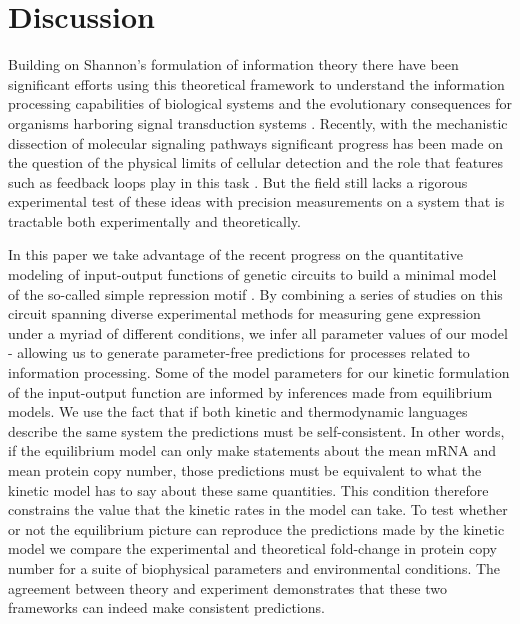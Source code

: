\section*{Discussion}

Building on Shannon's formulation of information theory there have been
significant efforts using this theoretical framework to understand the
information processing capabilities of biological systems and the evolutionary
consequences for organisms harboring signal transduction systems
\cite{Bergstrom2004, Taylor2007a, Tkacik2008, Polani2009, Nemenman2010,
Rivoire2011}. Recently, with the mechanistic dissection of molecular signaling
pathways significant progress has been made on the question of the physical
limits of cellular detection and the role that features such as feedback loops
play in this task \cite{Bialek2005, Libby2007, Tkacik2011, Rhee2012a,
Voliotis2014a}. But the field still lacks a rigorous experimental test of these
ideas with precision measurements on a system that is tractable both
experimentally and theoretically.

In this paper we take advantage of the recent progress on the quantitative
modeling of input-output functions of genetic circuits to build a minimal model
of the so-called simple repression motif . By combining a
series of studies on this circuit spanning diverse experimental methods for
measuring gene expression under a myriad of different conditions, we infer all
parameter values of our model - allowing us to generate parameter-free
predictions for processes related to information processing. Some of the model
parameters for our kinetic formulation of the input-output function are informed
by inferences made from equilibrium models. We use the fact that if both
kinetic and thermodynamic languages describe the same system the predictions
must be self-consistent. In other words, if the equilibrium model can only make
statements about the mean mRNA and mean protein copy number, those predictions
must be equivalent to what the kinetic model has to say about these same
quantities. This condition therefore constrains the value that the kinetic rates
in the model can take. To test whether or not the equilibrium picture can
reproduce the predictions made by the kinetic model we compare the experimental
and theoretical fold-change in protein copy number for a suite of biophysical
parameters and environmental conditions. The agreement between theory and
experiment demonstrates that these two frameworks can indeed make consistent
predictions.

